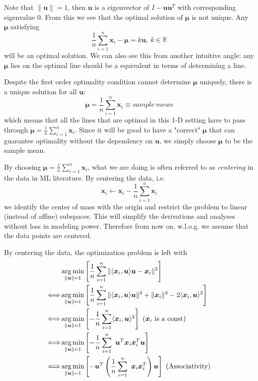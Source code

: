 \documentclass[../book-template.tex]{subfiles}
\begin{document}
Note that $\|\bm{u}\|=1$, then $\bm{u}$ is a eigenvector of $I-\bm{u}\bm{u}^T $ with corresponding eigenvalue 0. From this we see that the optimal solution of $\bm{\mu}$ is not unique. Any $\bm{\mu}$ satisfying 
\begin{equation*}
    \frac{1}{n}\sum_{i=1}^n\bm{x}_i-\bm{\mu} = k\bm{u},\ k\in \mathbb{R}
\end{equation*}
will be an optimal solution. We can also see this from another intuitive angle: any $\bm{\mu}$ lies on the optimal line should be a equivalent in terms of determining a line.
\par Despite the first order optimality condition cannot determine $\bm{\mu}$ uniquely, there is a unique solution for all $\bm{u}$:
\begin{equation*}
    \bm{\mu} = \frac{1}{n}\sum_{i=1}^n\bm{x}_i \equiv sample\ mean
\end{equation*}
which means that all the lines that are optimal in this 1-D setting have to pass through $ \bm{\mu} = \frac{1}{n}\sum_{i=1}^n\bm{x}_i$. Since it will be good to have a "correct" $\bm{\mu}$ that can guarantee optimality without the dependency on $\bm{u}$, we simply choose $\bm{\mu}$ to be the sample mean.
\par By choosing $\bm{\mu} = \frac{1}{n}\sum_{i=1}^n\bm{x}_i$, what we are doing is often referred to as \emph{centering} in the data in ML literature. By centering the data, i.e.
\begin{equation*}
    \bm{x}_i\leftarrow \bm{x}_i-\frac{1}{n}\sum_{i=1}^n\bm{x}_i
\end{equation*}
we identify the center of mass with the origin and restrict the problem to linear (instead of affine) subspaces. This will simplify the derivations and analyses without loss in modeling power. Therefore from now on, w.l.o.g. we assume that the data points are centered.
\par By centering the data, the optimization problem is left with
\begin{align}
    &\mathop{\arg\min}_{\|\bm{u}\|=1} \left[ \frac{1}{n}\sum_{i=1}^n \|\langle \bm{x}_i,\bm{u}\rangle \bm{u} - \bm{x}_i\|^2 \right]\notag\\
    \Longleftrightarrow &\mathop{\arg\min}_{\|\bm{u}\|=1} \left[ \frac{1}{n}\sum_{i=1}^n \|\langle \bm{x}_i,\bm{u}\rangle \bm{u}\|^2 + \|\bm{x}_i\|^2 - 2\langle \bm{x}_i,\bm{u}\rangle^2 \right]\notag\\
    \Longleftrightarrow &\mathop{\arg\min}_{\|\bm{u}\|=1} \left[- \frac{1}{n}\sum_{i=1}^n\langle \bm{x}_i,\bm{u}\rangle^2 \right]\ (\bm{x}_i\text{ is a const})\notag\\
    \Longleftrightarrow &\mathop{\arg\min}_{\|\bm{u}\|=1} \left[- \frac{1}{n}\sum_{i=1}^n\ \bm{u}^T\bm{x}_i\bm{x}_i^T\bm{u} \right]\notag\\
    \label{eq_2_obj_u}\Longleftrightarrow &\mathop{\arg\min}_{\|\bm{u}\|=1} \left[- \bm{u}^T\left(\frac{1}{n}\sum_{i=1}^n\ \bm{x}_i\bm{x}_i^T\right)\bm{u} \right]\ (\text{Associativity})
\end{align}
\end{document}
